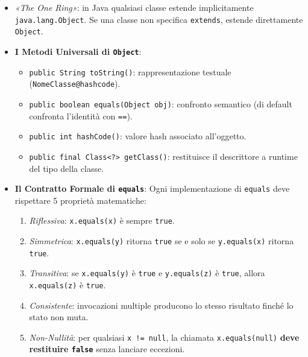 \documentclass[11pt,a4paper,oneside]{report}
\newcommand{\passthrough}[1]{#1}
\providecommand{\tightlist}{\setlength{\itemsep}{0pt}\setlength{\parskip}{0pt}}
\begin{document}
\begin{itemize}
\tightlist
\item
  \emph{«The One Ring»}: in Java qualsiasi classe estende implicitamente
  \passthrough{\lstinline!java.lang.Object!}. Se una classe non
  specifica \passthrough{\lstinline!extends!}, estende direttamente
  \passthrough{\lstinline!Object!}.
\item
  \textbf{I Metodi Universali di \passthrough{\lstinline!Object!}}:

  \begin{itemize}
  \tightlist
  \item
    \passthrough{\lstinline!public String toString()!}: rappresentazione
    testuale (\passthrough{\lstinline!NomeClasse@hashcode!}).
  \item
    \passthrough{\lstinline!public boolean equals(Object obj)!}:
    confronto semantico (di default confronta l'identità con
    \passthrough{\lstinline!==!}).
  \item
    \passthrough{\lstinline!public int hashCode()!}: valore hash
    associato all'oggetto.
  \item
    \passthrough{\lstinline!public final Class<?> getClass()!}:
    restituisce il descrittore a runtime del tipo della classe.
  \end{itemize}
\item
  \textbf{Il Contratto Formale di \passthrough{\lstinline!equals!}}:
  Ogni implementazione di \passthrough{\lstinline!equals!} deve
  rispettare 5 proprietà matematiche:

  \begin{enumerate}
  \def\labelenumi{\arabic{enumi}.}
  \tightlist
  \item
    \emph{Riflessiva}: \passthrough{\lstinline!x.equals(x)!} è sempre
    \passthrough{\lstinline!true!}.
  \item
    \emph{Simmetrica}: \passthrough{\lstinline!x.equals(y)!} ritorna
    \passthrough{\lstinline!true!} se e solo se
    \passthrough{\lstinline!y.equals(x)!} ritorna
    \passthrough{\lstinline!true!}.
  \item
    \emph{Transitiva}: se \passthrough{\lstinline!x.equals(y)!} è
    \passthrough{\lstinline!true!} e
    \passthrough{\lstinline!y.equals(z)!} è
    \passthrough{\lstinline!true!}, allora
    \passthrough{\lstinline!x.equals(z)!} è
    \passthrough{\lstinline!true!}.
  \item
    \emph{Consistente}: invocazioni multiple producono lo stesso
    risultato finché lo stato non muta.
  \item
    \emph{Non-Nullità}: per qualsiasi
    \passthrough{\lstinline"x != null"}, la chiamata
    \passthrough{\lstinline!x.equals(null)!} \textbf{deve restituire
    \passthrough{\lstinline!false!}} senza lanciare eccezioni.
  \end{enumerate}
\end{itemize}
\end{document}
